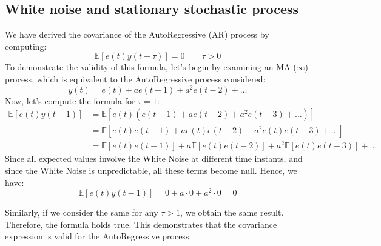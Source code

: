 \subsection{White noise and stationary stochastic process}
We have derived the covariance of the AutoRegressive (AR) process by computing:
\[\mathbb{E}\left[e(t)y(t-\tau)\right]=0 \qquad \tau >0\]
To demonstrate the validity of this formula, let's begin by examining an MA ($\infty$) process, which is equivalent to the AutoRegressive process considered:
\[y(t)=e(t)+ae(t-1)+a^2e(t-2)+\dots\]
Now, let's compute the formula for $\tau = 1$:
\begin{align*}
    \mathbb{E}\left[e(t)y(t-1)\right]   &= \mathbb{E}\left[e(t)\left(e(t-1)+ae(t-2)+a^2e(t-3)+\dots\right)\right] \\ 
                                        &= \mathbb{E}\left[e(t)e(t-1)+ae(t)e(t-2)+a^2e(t)e(t-3)+\dots\right] \\ 
                                        &= \mathbb{E}\left[e(t)e(t-1)\right]+a\mathbb{E}\left[e(t)e(t-2)\right]+a^2\mathbb{E}\left[e(t)e(t-3)\right]+\dots                                      
\end{align*}
Since all expected values involve the White Noise at different time instants, and since the White Noise is unpredictable, all these terms become null.
Hence, we have:
\[\mathbb{E}\left[e(t)y(t-1)\right]=0+a\cdot 0+a^2\cdot 0=0\]

Similarly, if we consider the same for any $\tau > 1$, we obtain the same result. 
Therefore, the formula holds true. 
This demonstrates that the covariance expression is valid for the AutoRegressive process.